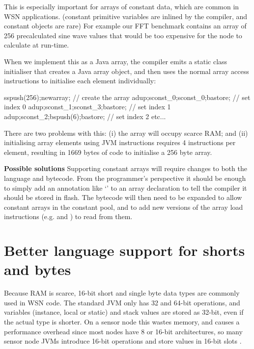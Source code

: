 This is especially important for arrays of constant data, which are common in WSN applications. (constant primitive variables are inlined by the compiler, and constant objects are rare) For example our FFT benchmark contains an array of 256 precalculated sine wave values that would be too expensive for the node to calculate at run-time.

When we implement this as a  Java array, the compiler emits a static class initialiser that creates a Java array object, and then uses the normal array access instructions to initialise each element individually:

sspush(256);newarray;       // create the array
adup;sconst\_0;sconst\_0;bastore;  // set index 0
adup;sconst\_1;sconst\_3;bastore;  // set index 1
adup;sconst\_2;bspush(6);bastore; // set index 2
etc...


There are two problems with this: (i) the array will occupy scarce RAM; and (ii) initialising array elements using JVM instructions requires 4 instructions per element, resulting in 1669 bytes of code to initialise a 256 byte array.

% 

\textbf{Possible solutions}
Supporting constant arrays will require changes to both the language and bytecode. From the programmer's perspective it should be enough to simply add an annotation like `' to an array declaration to tell the compiler it should be stored in flash. The bytecode will then need to be expanded to allow constant arrays in the constant pool, and to add new versions of the array load instructions (e.g.  and ) to read from them.



\section{Better language support for shorts and bytes}
\label{sec-small-datatypes}
Because RAM is scarce, 16-bit short and single byte data types are commonly used in WSN code. The standard JVM only has 32 and 64-bit operations, and variables (instance, local or static) and stack values are stored as 32-bit, even if the actual type is shorter. On a sensor node this wastes memory, and causes a performance overhead since most nodes have 8 or 16-bit architectures, so many sensor node JVMs introduce 16-bit operations and store values in 16-bit slots \cite{Brouwers:2009cj}.

